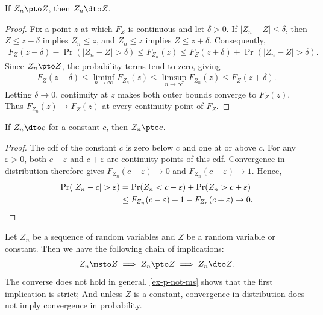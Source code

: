 \documentclass[a4paper,12pt]{article}
\begin{document}
\begin{proposition}
	If $Z_n\pto Z$, then $Z_n\dto Z$.
\end{proposition}
\begin{proof}
	Fix a point $z$ at which $F_Z$ is continuous and let $\delta>0$.
	If $|Z_n-Z|\le\delta$, then $Z\le z-\delta$ implies $Z_n\le z$,
	and $Z_n\le z$ implies $Z\le z+\delta$.
	Consequently,
	\begin{align*}
		F_Z(z-\delta)-\Pr(|Z_n-Z|>\delta)
		\le F_{Z_n}(z)
		\le F_Z(z+\delta)+\Pr(|Z_n-Z|>\delta).
	\end{align*}
	Since $Z_n\pto Z$, the probability terms tend to zero, giving
	\begin{align*}
		F_Z(z-\delta)
		\le\liminf_{n\to\infty}F_{Z_n}(z)
		\le\limsup_{n\to\infty}F_{Z_n}(z)
		\le F_Z(z+\delta).
	\end{align*}
	Letting $\delta\to0$, continuity at $z$ makes both outer bounds converge to $F_Z(z)$.
	Thus $F_{Z_n}(z)\to F_Z(z)$ at every continuity point of $F_Z$.
\end{proof}

\begin{proposition}\label{prop-d-to-p}
	If $Z_n\dto c$ for a constant $c$, then $Z_n\pto c$.
\end{proposition}
\begin{proof}
	The \gls{cdf} of the constant $c$ is zero below $c$ and one at or above $c$.
	For any $\varepsilon>0$, both $c-\varepsilon$ and $c+\varepsilon$ are continuity points of this \gls{cdf}.
	Convergence in distribution therefore gives
	$F_{Z_n}(c-\varepsilon)\to0$
	and
	$F_{Z_n}(c+\varepsilon)\to1$.
	Hence,
	\begin{align*}
		\Pr(|Z_n-c|>\varepsilon)
		&=\Pr(Z_n<c-\varepsilon)+\Pr(Z_n>c+\varepsilon)\\
		&\le F_{Z_n}(c-\varepsilon)+1-F_{Z_n}(c+\varepsilon)\to0.
		\qedhere
	\end{align*}
\end{proof}

\begin{remark}
	Let $Z_n$ be a sequence of random variables and $Z$ be a random variable or constant.
	Then we have the following chain of implications:
	\begin{align}
		Z_n\msto Z
		\implies Z_n\pto Z
		\implies Z_n\dto Z.
	\end{align}
	The converse does not hold in general.
	\autoref{ex-p-not-ms} shows that the first implication is strict;
	And unless $Z$ is a constant, convergence in distribution does not imply convergence in probability.
\end{remark}
\end{document}
